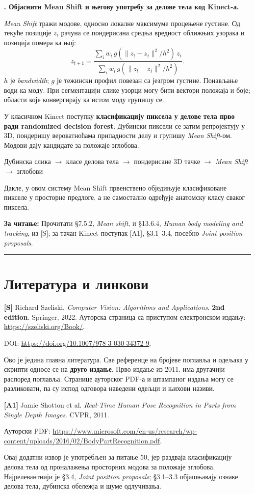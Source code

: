 \documentclass[10pt,a4paper]{article}
\newcommand{\en}[1]{\textit{#1}}
\newcounter{pitanje}
\newenvironment{odgovor}[1]{\stepcounter{pitanje}\begin{minipage}[t][0.455\textheight][t]{\textwidth}\vspace{0pt}\textbf{\thepitanje. #1}\par\smallskip}{\end{minipage}\par\ifodd\value{pitanje}\vspace{0.025\textheight}\hrule\vspace{0.015\textheight}\else\newpage\fi}
\newcommand{\izvor}[1]{\par\vfill{\footnotesize\textbf{За читање:} #1}\par}
\newcommand{\lanac}[1]{\begin{center}\small #1\end{center}}
\begin{document}
\begin{odgovor}{Објаснити Mean Shift и његову употребу за делове тела код Kinect-а.}
\en{Mean Shift} тражи модове, односно локалне максимуме процењене густине. Од текуће позиције $z_t$ рачуна се пондерисана средња вредност оближњих узорака и позиција помера ка њој:
\[
z_{t+1}=\frac{\sum_i w_i\,g(\|z_t-z_i\|^2/h^2)\,z_i}
{\sum_i w_i\,g(\|z_t-z_i\|^2/h^2)}.
\]
$h$ је \en{bandwidth}; $g$ је тежински профил повезан са језгром густине. Понављање води ка моду. При сегментацији слике узорци могу бити вектори положаја и боје; области које конвергирају ка истом моду групишу се.

У класичном Kinect поступку \textbf{класификацију пиксела у делове тела прво ради randomized decision forest}. Дубински пиксели се затим репројектују у 3D, пондеришу вероватноћама припадности делу и групишу \en{Mean Shift}-ом. Модови дају кандидате за положаје зглобова.
\lanac{Дубинска слика $\to$ класе делова тела $\to$ пондерисане 3D тачке $\to$ \en{Mean Shift} $\to$ зглобови}
Дакле, у овом систему Mean Shift првенствено обједињује класификоване пикселе у просторне предлоге, а не самостално одређује анатомску класу сваког пиксела.
\izvor{Прочитати §7.5.2, \en{Mean shift}, и §13.6.4, \en{Human body modeling and tracking}, из [S]; за тачан Kinect поступак [A1], §3.1--3.4, посебно \en{Joint position proposals}.}
\end{odgovor}

\section*{Литература и линкови}
\textbf{[S]} Richard Szeliski. \en{Computer Vision: Algorithms and Applications}. \textbf{2nd edition}. Springer, 2022. Ауторска страница са приступом електронском издању:
\url{https://szeliski.org/Book/}.

DOI: \url{https://doi.org/10.1007/978-3-030-34372-9}.

Ово је једина главна литература. Све референце на бројеве поглавља и одељака у скрипти односе се на \textbf{друго издање}. Прво издање из 2011. има другачији распоред поглавља. Странице ауторског PDF-а и штампаног издања могу се разликовати, па су испод одговора наведени одељци и њихови називи.

\medskip
\textbf{[A1]} Jamie Shotton et al. \en{Real-Time Human Pose Recognition in Parts from Single Depth Images}. CVPR, 2011.

Ауторски PDF: \url{https://www.microsoft.com/en-us/research/wp-content/uploads/2016/02/BodyPartRecognition.pdf}.

Овај додатни извор је употребљен за питање 50, јер раздваја класификацију делова тела од проналажења просторних модова за положаје зглобова. Најрелевантнији је §3.4, \en{Joint position proposals}; §3.1--3.3 објашњавају ознаке делова тела, дубинска обележја и шуме одлучивања.
\end{document}
